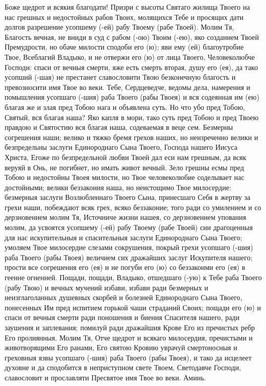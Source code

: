 \mychapterending

\begin{mymulticols}


Боже щедрот и всякия благодати! Призри с высоты Святаго жилища Твоего на нас грешных и недостойных рабов Твоих, молящихся Тебе и просящих дати долгов разрешение усопшему (-ей) рабу Твоему (рабе Твоей). Молим Тя, Благость вечная, не вниди в суд с рабом (-ою) Твоим (-ею), яко созданием Твоей Премудрости, но обаче милости сподоби его (ю); яви ему (ей) благоутробие Твое, Всеблагий Владыко, и не отвержи его (ю) от лица Твоего, Человеколюбче Господи: спаси от вечныя смерти, яже есть смерть вторая, душу его (ея), да тако усопший (-шая) не престанет славословити Твою безконечную благость и превозносити имя Твое во веки. Тебе, Сердцеведче, ведомы дела, намерения и помышления усопшаго (-шия) раба Твоего (рабы Твоея) и вся содеянная им (ею) благая же и злая пред Тобою нага и объявлена суть. Но что убо пред Тобою, Святый, вся благая наша? Яко капля в мори, тако суть пред Тобою и пред Твоею правдою и Святостию вся благая наша, содеваемая в веце сем. Безмерны согрешения наши; велико и тяжко бремя грехов наших, но неизреченно велики и безпредельны заслуги Единороднаго Сына Твоего, Господа нашего Иисуса Христа, Егоже по безпредельной любви Твоей дал еси нам грешным, да всяк веруяй в Онь, не погибнет, но имать живот вечный. Зело грешны есмы пред Тобою и недостойны Твоея милости, но Твое человеколюбие соделывает нас достойными; велики беззакония наша, но неистощимо Твое милосердие: безмерныя заслуги Возлюбленнаго Твоего Сына, принесшаго Себя в жертву за грехи наши, побеждают всяк грех, всяко беззаконие; того ради со умилением и со дерзновением молим Тя, Источниче жизни нашея, со дерзновением упования молим, да усвоятся усопшему (-ей) рабу Твоему (рабе Твоей)  сии драгоценныя для нас искупительныя и спасительныя заслуги Единороднаго Сына Твоего; умоляем Твое милосердие слезами сокрушения, покрый грехи усопшаго (-шия) раба Твоего (рабы Твоея) величием сих дражайших заслуг Искупителя нашего; прости все согрешения его (ея) и не погуби его (ю) со беззаконми его (ея) в геенне огненней. Пощади, пощади, Владыко, отшедшаго (-ую) к Тебе раба Твоего (рабу Твою)  и вечных мучений избави, избави ради безмерных и неизглаголанных душевных скорбей и болезней Единороднаго Сына Твоего, понесенных Им пред испитием горькой чаши страданий Своих; пощади его (ю) и спаси от вечныя смерти ради поношения и биения Спасителя нашего, ради заушения и заплевания; помилуй ради дражайшия Крове Его из пречистых ребр Его пролиянныя. Молим Тя, Отче щедрот и всякаго милосердия, пречистыми и животворящими Его ранами, Его святою Кровию уврачуй смертоносныя и греховныя язвы усопшаго (-шия) раба Твоего (рабы Твоея), и тако да исцелеет духовне и да сподобится в неприступном свете Твоем, Светодавче Господи, славословит и прославляти Пресвятое имя Твое во веки. Аминь. 

\end{mymulticols}

